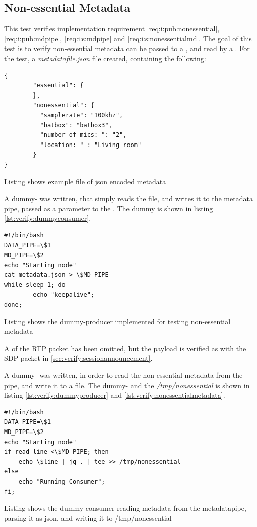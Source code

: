 \subsection{Non-essential Metadata} \label{sec:verify:nonessentialmetadata}
This test verifies implementation requirement \ref{req:i:pub:nonessential}, \ref{req:i:pub:mdpipe}, \ref{req:i:s:mdpipe} and \ref{req:i:s:nonessentialmd}. The goal of this test is to verify non-essential metadata can be passed to a \pro{}, and read by a \con{}. 
For the test, a \textit{metadatafile.json} file created, containing the following:

\begin{listing}[H] 
\begin{verbatim}
{
        "essential": {
        },
        "nonessential": {
          "samplerate": "100khz",
          "batbox": "batbox3",
          "number of mics: ": "2",
          "location: " : "Living room"
        }
}
\end{verbatim}
\caption{Listing shows example file of json encoded metadata}
\label{lst:verify:nonessentialmd}
\end{listing}

A dummy-\pro{} was written, that simply reads the file, and writes it to the metadata pipe, passed as a parameter to the \pro{}. The dummy \pro{} is shown in listing \ref{lst:verify:dummyconsumer}.

\begin{listing}[H] 
\begin{verbatim}
#!/bin/bash
DATA_PIPE=\$1
MD_PIPE=\$2
echo "Starting node"
cat metadata.json > \$MD_PIPE
while sleep 1; do
        echo "keepalive";
done;  
\end{verbatim}
\caption{Listing shows the dummy-producer implemented for testing non-essential metadata}
\label{lst:verify:dummyconsumer}
\end{listing}

A  of the RTP packet has been omitted, but the payload is verified as with the SDP packet in \ref{sec:verify:sessionannouncement}.

A dummy-\con{} was written, in order to read the non-essential metadata from the pipe, and write it to a file. The dummy-\con{} and the \textit{/tmp/nonessential} is shown in listing \ref{lst:verify:dummyproducer} and \ref{lst:verify:nonessentialmetadata}.


\begin{listing}[H] 
\begin{verbatim}
#!/bin/bash
DATA_PIPE=\$1
MD_PIPE=\$2
echo "Starting node"
if read line <\$MD_PIPE; then
	echo \$line | jq . | tee >> /tmp/nonessential
else
	echo "Running Consumer";
fi;  
\end{verbatim}
\caption{Listing shows the dummy-consumer reading metadata from the metadatapipe, parsing it as json, and writing it to /tmp/nonessential}
\label{lst:verify:dummyproducer}
\end{listing}



